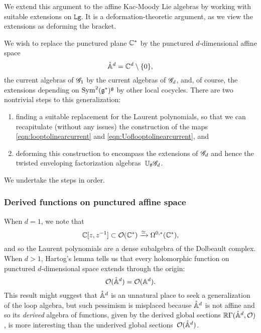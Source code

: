We extend this argument to the affine Kac-Moody Lie algebras by working with suitable extensions on $\mathtt{Lg}$.
It is a deformation-theoretic argument, as we view the extensions as deforming the bracket.

We wish to replace the punctured plane $\mathbb C^*$ by the punctured $d$-dimensional affine space 
\[
\mathring{\mathbb A}^d = \mathbb C^d \setminus \{0\},
\] 
the current algebras of $\mathscr G_1$ by the current algebras of $\mathscr G_d$,
and, of course, the extensions depending on ${\rm Sym}^2(\mathfrak g^*)^\mathfrak g$ by other local cocycles.
There are two nontrivial steps to this generalization:
\begin{enumerate}
\item finding a suitable replacement for the Laurent polynomials, so that we can recapitulate (without any issues) the construction of the maps \eqref{eqn:looptolinearcurrent} and \eqref{eqn:Uoflooptolinearcurrent}, and
\item deforming this construction to encompass the extensions of $\mathscr G_d$ and hence the twisted enveloping factorization algebras~$\mathbb U_\theta \mathscr G_d$.
\end{enumerate}
We undertake the steps in order.


\subsubsection{Derived functions on punctured affine space}

When $d=1$, we note that
\[
\mathbb C[z,z^{-1}] \subset \mathcal O(\mathbb C^*) \xrightarrow{\simeq} \Omega^{0,*}(\mathbb C^*),
\]
and so the Laurent polynomials are a dense subalgebra of the Dolbeault complex.
When $d >1$, Hartog's lemma tells us that every holomorphic function on punctured $d$-dimensional space extends through the origin:
\[
\mathcal O(\mathring{\mathbb A}^d) = \mathcal O(\mathbb A^d).
\]
This result might suggest that $\mathring{\mathbb A}^d$ is an unnatural place to seek a generalization of the loop algebra,
but such pessimism is misplaced because $\mathring{\mathbb A}^d$ is not affine 
and so its {\em derived} algebra of functions, 
given by the derived global sections $\mathbb R \Gamma(\mathring{\mathbb A}^d, \mathcal O)$, 
is more interesting than the underived global sections~$\mathcal O(\mathring{\mathbb A}^d)$.

